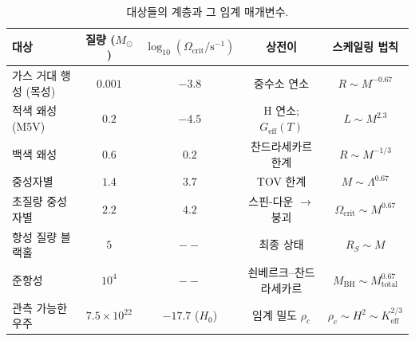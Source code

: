 \documentclass[11pt,a4paper]{article}
\begin{document}
	\begin{table}[htbp]
		\centering
		\caption{대상들의 계층과 그 임계 매개변수.}
		\label{tab:hierarchy}
		\small
		\begin{tabular}{l c c c c}
			\toprule
			\textbf{대상} & \textbf{질량 (\(M_\odot\))} & \(\log_{10}(\Omega_{\mathrm{crit}}/\mathrm{s^{-1}})\) & \textbf{상전이} & \textbf{스케일링 법칙} \\
			\midrule
			가스 거대 행성 (목성) & \(0.001\) & \(-3.8\) & 중수소 연소 & \(R\sim M^{-0.67}\) \\
			적색 왜성 (M5V) & \(0.2\) & \(-4.5\) & H 연소; \(G_{\mathrm{eff}}(T)\) & \(L\sim M^{2.3}\) \\
			백색 왜성 & \(0.6\) & \(0.2\) & 찬드라세카르 한계 & \(R\sim M^{-1/3}\) \\
			중성자별 & \(1.4\) & \(3.7\) & TOV 한계 & \(M\sim\Lambda^{0.67}\) \\
			초질량 중성자별 & \(2.2\) & \(4.2\) & 스핀-다운 \(\to\) 붕괴 & \(\Omega_{\mathrm{crit}}\sim M^{0.67}\) \\
			항성 질량 블랙홀 & \(5\) & \(--\) & 최종 상태 & \(R_S\sim M\) \\
			준항성 & \(10^4\) & \(--\) & 쇤베르크–찬드라세카르 & \(M_{\mathrm{BH}}\sim M_{\mathrm{total}}^{0.67}\) \\
			관측 가능한 우주 & \(7.5\times10^{22}\) & \(-17.7\) (\(H_0\)) & 임계 밀도 \(\rho_c\) & \(\rho_c\sim H^2\sim K_{\mathrm{eff}}^{2/3}\) \\
			\bottomrule
		\end{tabular}
	\end{table}
	
\end{document}
